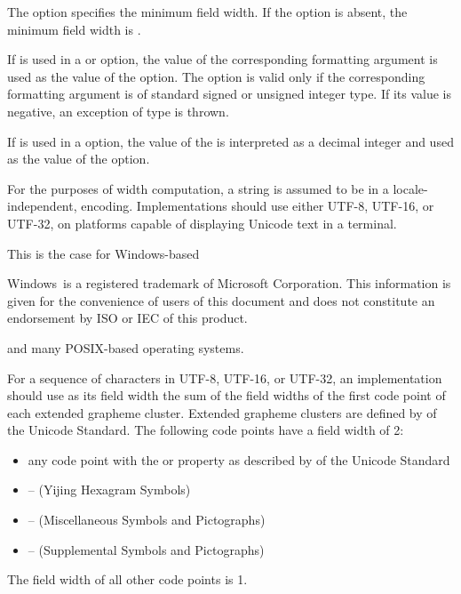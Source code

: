 \pnum
The  option specifies the minimum field width.
If the  option is absent,
the minimum field width is .

\pnum
If  is used in
a  or  option,
the value of the corresponding formatting argument is used as the value of the option.
The option is valid only if the corresponding formatting argument is
of standard signed or unsigned integer type.
If its value is negative,
an exception of type  is thrown.

\pnum
If  is used in a
 option, the value of the 
is interpreted as a decimal integer and used as the value of the option.

\pnum
For the purposes of width computation,
a string is assumed to be in
a locale-independent,
 encoding.
Implementations should use either UTF-8, UTF-16, or UTF-32,
on platforms capable of displaying Unicode text in a terminal.
\begin{note}
This is the case for Windows\textregistered{}-based
\begin{footnote}
Windows\textregistered\ is a registered trademark of Microsoft Corporation.
This information is given for the convenience of users of this document and
does not constitute an endorsement by ISO or IEC of this product.
\end{footnote}
and many POSIX-based operating systems.
\end{note}

\pnum
For a sequence of characters in UTF-8, UTF-16, or UTF-32,
an implementation should use as its field width
the sum of the field widths of the first code point
of each extended grapheme cluster.
Extended grapheme clusters are defined by  of the Unicode Standard.
The following code points have a field width of 2:
\begin{itemize}
\item
any code point with the  or
 property as described by
 of the Unicode Standard
\item
{} --  (Yijing Hexagram Symbols)
\item
{} --  (Miscellaneous Symbols and Pictographs)
\item
{} --  (Supplemental Symbols and Pictographs)
\end{itemize}
The field width of all other code points is 1.

